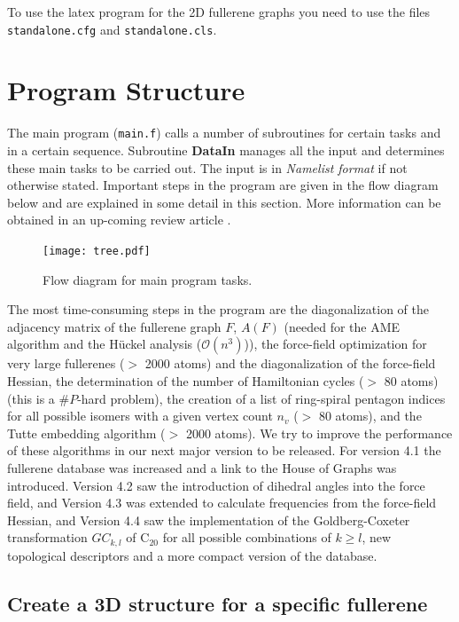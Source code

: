 \documentclass[article,a4paper,twoside]{memoir}
\newcommand{\C}[1]{\ensuremath{\mathrm{C}_{#1}}}
\newcommand{\filename}[1]{\texttt{#1}}
\newcommand{\funname}[1]{{\color{blue}\textbf{#1}}}
\begin{document}
To use the latex program for the 2D fullerene graphs you need to use the files \filename{standalone.cfg} and \filename{standalone.cls}.


\section{Program Structure}
The main program (\filename{main.f}) calls a number of subroutines for certain tasks and in a certain sequence.
Subroutine \funname{DataIn} manages all the input and determines these main tasks to be carried out.
The input is in \textit{Namelist format} if not otherwise stated. 
Important steps in the program are given in the flow diagram below and are
explained in some detail in this section. More information can be obtained in an up-coming review article \cite{PSJA}.

\begin{figure}[htbp]
   	\centering
	\texttt{[image: tree.pdf]} 
    \caption{Flow diagram for main program tasks.}
    \label{pic:flowdiagram}
\end{figure}

The most time-consuming steps in the program are the diagonalization of the adjacency matrix 
of the fullerene graph $F$, $A(F)$  
(needed for the AME algorithm and the H\"uckel analysis ($\mathcal{O}(n^3)$)), the force-field optimization for
very large fullerenes ($>$ 2000 atoms)  and the diagonalization of
the force-field Hessian, the determination of the number of Hamiltonian cycles
($>$ 80 atoms) (this is a $\#P$-hard problem), the creation of a list of ring-spiral pentagon
indices for all possible isomers with a given vertex count $n_v$ ($>$ 80 atoms), 
and the Tutte embedding algorithm ($>$ 2000 atoms). We try to improve the performance of these algorithms
in our next major version to be released. For version 4.1 the fullerene database was increased and a link to
the House of Graphs was introduced. Version 4.2 saw the introduction of dihedral angles into the force field,
and Version 4.3 was extended to calculate frequencies from the force-field Hessian, and Version 4.4 saw
the implementation of the Goldberg-Coxeter transformation $GC_{k,l}$ of \C{20} for all possible combinations of $k \geq l$,
new topological descriptors and a more compact version of the database.

\subsection{Create a 3D structure for a specific fullerene}
\end{document}
